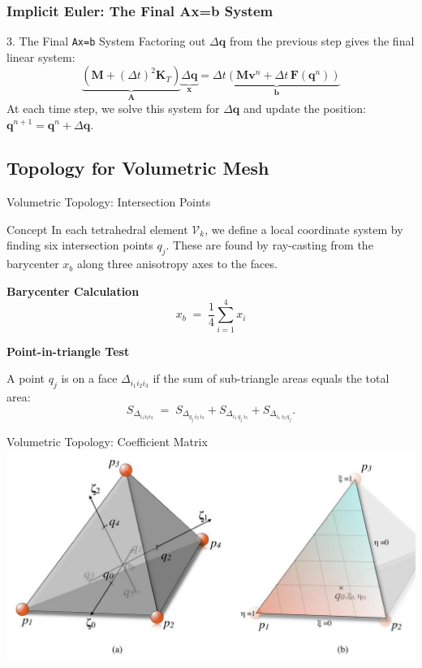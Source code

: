 \documentclass{beamer}
\begin{document}
\begin{frame}[fragile]
    \frametitle{Implicit Euler: The Final Ax=b System}
    \begin{exampleblock}{3. The Final \texttt{Ax=b} System}
        Factoring out $\Delta\mathbf{q}$ from the previous step gives the final linear system:
        \[
            \underbrace{\left( \mathbf{M} + (\Delta t)^2 \mathbf{K}_T \right)}_{\mathbf{A}} \underbrace{\Delta\mathbf{q}}_{\mathbf{x}} = \underbrace{\Delta t \left( \mathbf{M}\mathbf{v}^n + \Delta t\,\mathbf{F}(\mathbf{q}^n) \right)}_{\mathbf{b}}
        \]
        At each time step, we solve this system for $\Delta\mathbf{q}$ and update the position: $\mathbf{q}^{n+1} = \mathbf{q}^n + \Delta\mathbf{q}$.
    \end{exampleblock}
\end{frame}
\subsection{Topology for Volumetric Mesh}

\begin{frame}[fragile]{Volumetric Topology: Intersection Points}
    \begin{block}{Concept}
    In each tetrahedral element $\mathcal V_k$, we define a local coordinate system by finding six intersection points $q_{j}$. These are found by ray-casting from the barycenter $x_b$ along three anisotropy axes to the faces.
    \end{block}
    
    \textbf{Barycenter Calculation}
    \[
        x_b \;=\;\frac{1}{4}\sum_{i=1}^4 x_i
    \]
    
    \textbf{Point-in-triangle Test}
    
    A point $q_j$ is on a face $\Delta_{i_1i_2i_3}$ if the sum of sub-triangle areas equals the total area:
    \[
        S_{\Delta_{i_1i_2i_3}} \;=\; S_{\Delta_{q_j\,i_2\,i_3}} + S_{\Delta_{i_1\,q_j\,i_3}} + S_{\Delta_{i_1\,i_2\,q_j}}.
    \]
\end{frame}

\begin{frame}[fragile]{Volumetric Topology: Coefficient Matrix}
\includegraphics[width=\textwidth]{images/fig2.6.jpg}
\end{frame}
\end{document}

